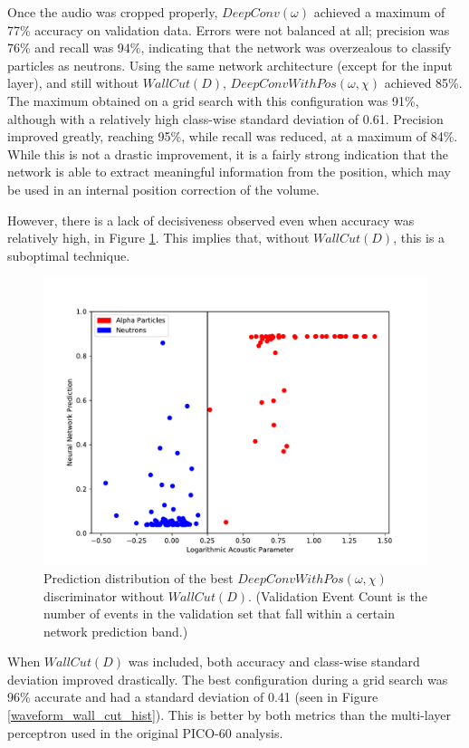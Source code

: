 \documentclass[10pt]{article}
\begin{document}
Once the audio was cropped properly, $DeepConv(\omega)$ achieved a maximum of 77\% accuracy on validation data. Errors were not balanced at all; precision was 76\% and recall was 94\%, indicating that the network was overzealous to classify particles as neutrons. Using the same network architecture (except for the input layer), and still without $WallCut(D)$, $DeepConvWithPos(\omega, \chi)$ achieved 85\%. The maximum obtained on a grid search with this configuration was 91\%, although with a relatively high class-wise standard deviation of 0.61. Precision improved greatly, reaching 95\%, while recall was reduced, at a maximum of 84\%. While this is not a drastic improvement, it is a fairly strong indication that the network is able to extract meaningful information from the position, which may be used in an internal position correction of the volume.

However, there is a lack of decisiveness observed even when accuracy was relatively high, in Figure \ref{waveform_hist}. This implies that, without $WallCut(D)$, this is a suboptimal technique.

\begin{figure}[H]
    \centering
    \includegraphics[width=\textwidth]{waveform_hist}
    \caption{\label{waveform_hist} Prediction distribution of the best $DeepConvWithPos(\omega, \chi)$ discriminator without $WallCut(D)$. (Validation Event Count is the number of events in the validation set that fall within a certain network prediction band.)}
\end{figure}

When $WallCut(D)$ was included, both accuracy and class-wise standard deviation improved drastically. The best configuration during a grid search was 96\% accurate and had a standard deviation of 0.41 (seen in Figure \ref{waveform_wall_cut_hist}). This is better by both metrics than the multi-layer perceptron used in the original PICO-60 analysis.
\end{document}
